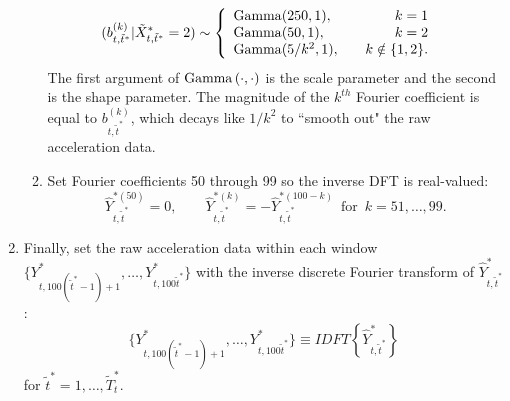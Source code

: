 \begin{enumerate}
\begin{enumerate}
\begin{align}
\begin{split}
    	(b^{(k)}_{t,\tilde t^*}|\tilde X^*_{t,\tilde t^*} = 2) &\sim \left\{\begin{array}{lr}
    	{\rm{Gamma}}(250,1), & k = 1 \\
    	{\rm{Gamma}}(50,1), & k = 2 \\
    	{\rm{Gamma}}(5/k^2, 1), \quad & k \notin \{1,2\}.
    	\end{array}\right. 
    \end{split}
    \label{eqn:bdist}
    \end{align}
    The first argument of ${\rm{Gamma}}\left(\cdot,\cdot\right)$ is the scale parameter and the second is the shape parameter. The magnitude of the $k^{th}$ Fourier coefficient is equal to $b^{(k)}_{t,\tilde t^*}$, which decays like $1/k^2$ to ``smooth out" the raw acceleration data.
    \item Set Fourier coefficients 50 through 99 so the inverse DFT is real-valued:
    $$
    \hat{Y}^{*(50)}_{t,\tilde t^*} = 0, \qquad
	\hat{Y}^{*(k)}_{t,\tilde t^*} = -\hat{Y}^{*(100-k)}_{t,\tilde t^*} \enspace \text{for} \enspace k = 51,\ldots,99.
    $$
    \end{enumerate}
    \item Finally, set the raw acceleration data within each window $\{Y^*_{t,100(\tilde t^* - 1) + 1},\ldots,Y^*_{t,100\tilde t^*}\}$ with the inverse discrete Fourier transform of $\hat{Y}^*_{t,\tilde t^*}$:
    $$\{Y^*_{t,100(\tilde t^* - 1) + 1},\ldots,Y^*_{t,100\tilde t^*}\} \equiv IDFT\left\{\hat{Y}^*_{t,\tilde t^*}\right\}$$
    for $\tilde t^* = 1,\ldots,\tilde T^*_t.$
\end{enumerate}

